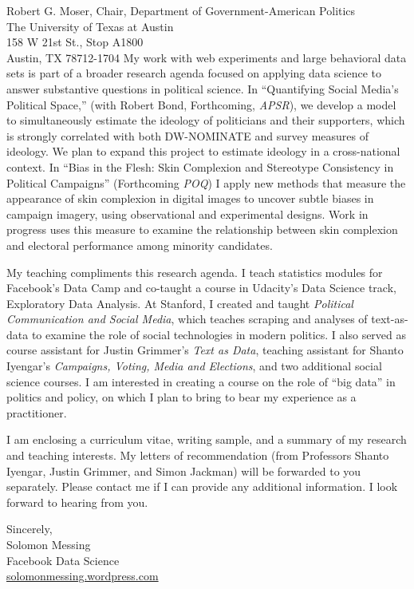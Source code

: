 \documentclass[fontsize=12pt, paper=a4]{scrlttr2}
\begin{document}
\begin{letter}{Robert G. Moser, Chair, Department of Government-American Politics\\
The University of Texas at Austin\\
158 W 21st St., Stop A1800\\
Austin, TX 78712-1704}
My work with web experiments and large behavioral data sets is part of a broader research agenda focused on applying data science to answer substantive questions in political science.  In ``Quantifying Social Media's Political Space,'' (with Robert Bond, Forthcoming, \emph{APSR}), we develop a model to simultaneously estimate the ideology of politicians and their supporters, which is strongly correlated with both DW-NOMINATE and survey measures of ideology.  We plan to expand this project to estimate ideology in a cross-national context.  In ``Bias in the Flesh: Skin Complexion and Stereotype Consistency in Political Campaigns'' (Forthcoming \emph{POQ}) I apply new methods that measure the appearance of skin complexion in digital images to uncover subtle biases in campaign imagery, using observational and experimental designs.  Work in progress uses this measure to examine the relationship between skin complexion and electoral performance among minority candidates.  

My teaching compliments this research agenda.  I teach statistics modules for Facebook's Data Camp and co-taught a course in Udacity's Data Science track, Exploratory Data Analysis.  At Stanford, I created and taught \emph{Political Communication and Social Media}, which teaches scraping and analyses of text-as-data to examine the role of social technologies in modern politics.  I also served as course assistant for Justin Grimmer's \emph{Text as Data}, teaching assistant for Shanto Iyengar's \emph{Campaigns, Voting, Media and Elections}, and two additional social science courses.  I am interested in creating a course on the role of ``big data'' in politics and policy, on which I plan to bring to bear my experience as a practitioner.  

I am enclosing a curriculum vitae, writing sample, and a summary of my research and teaching interests. My letters of recommendation (from Professors Shanto Iyengar, Justin Grimmer, and Simon Jackman) will be forwarded to you separately. Please contact me if I can provide any additional information. I look forward to hearing from you.

\enlargethispage{6\baselineskip}

\closing{
Sincerely, \\
Solomon Messing\\
Facebook Data Science \\
 \url{solomonmessing.wordpress.com}
}

\end{letter}

%
%
\end{document}
